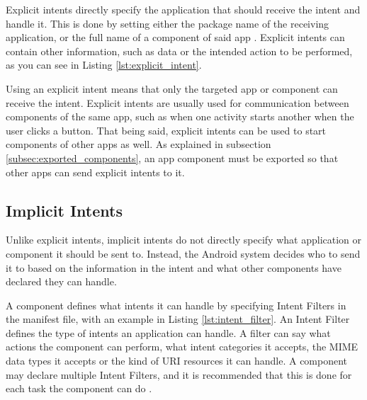     Explicit intents directly specify the application that should receive the intent and handle it. This is done by setting either the package name of the receiving application, or the full name of a component of said app \cite{intents_and_intent_filters}. Explicit intents can contain other information, such as data or the intended action to be performed, as you can see in Listing \ref{lst:explicit_intent}.
    
    
    
    Using an explicit intent means that only the targeted app or component can receive the intent. Explicit intents are usually used for communication between components of the same app, such as when one activity starts another when the user clicks a button. That being said, explicit intents can be used to start components of other apps as well. As explained in subsection \ref{subsec:exported_components}, an app component must be exported so that other apps can send explicit intents to it.
    
    \subsection{Implicit Intents}
        \label{subsec:implicit_intents}
        
    Unlike explicit intents, implicit intents do not directly specify what application or component it should be sent to. Instead, the Android system decides who to send it to based on the information in the intent and what other components have declared they can handle.
    
    A component defines what intents it can handle by specifying Intent Filters in the manifest file, with an example in Listing \ref{lst:intent_filter}. An Intent Filter defines the type of intents an application can handle. A filter can say what actions the component can perform, what intent categories it accepts, the MIME data types it accepts or the kind of URI resources it can handle. A component may declare multiple Intent Filters, and it is recommended that this is done for each task the component can do \cite{intents_and_intent_filters}.
    
    
    
